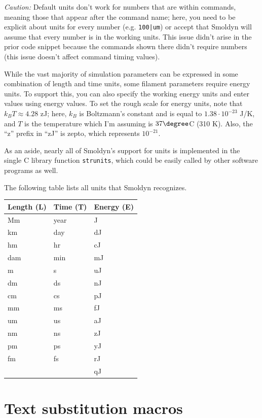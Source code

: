 \documentclass {scrbook}
\newcommand {\ttt} {\texttt}
\begin{document}
\textit{Caution:} Default units don't work for numbers that are within commands, meaning those that appear after the command name; here, you need to be explicit about units for every number (e.g. \ttt{100|um}) or accept that Smoldyn will assume that every number is in the working units. This issue didn't arise in the prior code snippet because the commands shown there didn't require numbers (this issue doesn't affect command timing values).

While the vast majority of simulation parameters can be expressed in some combination of length and time units, some filament parameters require energy units. To support this, you can also specify the working energy units and enter values using energy values. To set the rough scale for energy units, note that $k_B T \approx 4.28$ zJ; here, $k_B$ is Boltzmann's constant and is equal to $1.38\cdot10^{-23}$ J/K, and $T$ is the temperature which I'm assuming is $37\degree$C (310 K). Also, the ``z'' prefix in ``zJ'' is zepto, which represents $10^{-21}$.

As an aside, nearly all of Smoldyn's support for units is implemented in the single C library function \ttt{strunits}, which could be easily called by other software programs as well.

The following table lists all units that Smoldyn recognizes.

\begin{longtable}[c]{lll}
Length (L) & Time (T) & Energy (E) \\
\hline
Mm & year & J \\
km & day & dJ \\
hm & hr & cJ \\
dam & min & mJ \\
m & s & uJ \\
dm & ds & nJ \\
cm & cs & pJ \\
mm & ms & fJ \\
um & us & aJ \\
nm & ns & zJ \\
pm & ps & yJ \\
fm & fs & rJ \\
 & & qJ
\end{longtable}


\section{Text substitution macros}
\end{document}
